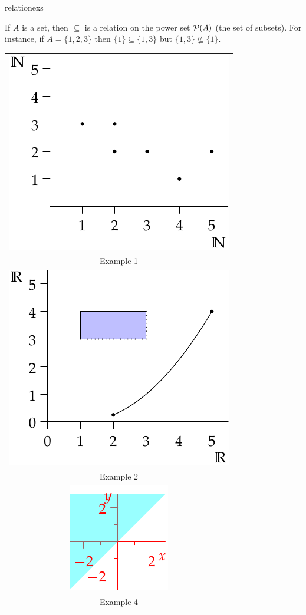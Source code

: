 \begin{examples}{}{relationexs}
\begin{enumerate}
\begin{minipage}[t]{0.79\linewidth}
		\item If $A$ is a set, then $\subseteq$ is a relation on the power set $\mathcal{P}(A)$ (the set of subsets).\smallbreak
		For instance, if $A=\{1,2,3\}$ then $\{1\}\subseteq\{1,3\}$ but $\{1,3\}\nsubseteq\{1\}$.
	  \end{minipage}
	  \hfill
	  \begin{minipage}[t]{0.2\linewidth}\vspace{-20pt}
	  	\hfill
	  	\begin{tabular}{@{}c@{}}
	  	\includegraphics{relations-01-reln1}\\
			Example 1\\[5pt]
			\includegraphics{relations-02-reln2}\\
			Example 2\\[5pt]
			\includegraphics{relations-02-reln3}\\
			Example 4
	  	\end{tabular}
	  \end{minipage}
	  

\end{enumerate}
\end{examples}
